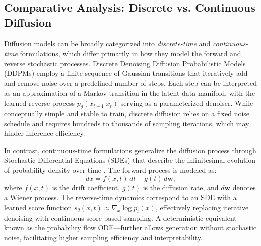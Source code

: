 \vspace{2em}

\subsection{Comparative Analysis: Discrete vs. Continuous Diffusion}

Diffusion models can be broadly categorized into \textit{discrete-time} and \textit{continuous-time} formulations, which differ primarily in how they model the forward and reverse stochastic processes. Discrete Denoising Diffusion Probabilistic Models (DDPMs) \cite{ho2020denoising} employ a finite sequence of Gaussian transitions that iteratively add and remove noise over a predefined number of steps. Each step can be interpreted as an approximation of a Markov transition in the latent data manifold, with the learned reverse process \( p_\theta(x_{t-1}|x_t) \) serving as a parameterized denoiser. While conceptually simple and stable to train, discrete diffusion relies on a fixed noise schedule and requires hundreds to thousands of sampling iterations, which may hinder inference efficiency.  

\vspace{1em}

In contrast, continuous-time formulations generalize the diffusion process through Stochastic Differential Equations (SDEs) that describe the infinitesimal evolution of probability density over time \cite{song2020score}. The forward process is modeled as:
\begin{equation}
    dx = f(x, t)\,dt + g(t)\,d\mathbf{w},
\end{equation}
where \( f(x, t) \) is the drift coefficient, \( g(t) \) is the diffusion rate, and \( d\mathbf{w} \) denotes a Wiener process. The reverse-time dynamics correspond to an SDE with a learned score function \( s_\theta(x, t) \approx \nabla_x \log p_t(x) \), effectively replacing iterative denoising with continuous score-based sampling. A deterministic equivalent—known as the probability flow ODE—further allows generation without stochastic noise, facilitating higher sampling efficiency and interpretability.  

\vspace{1em}

